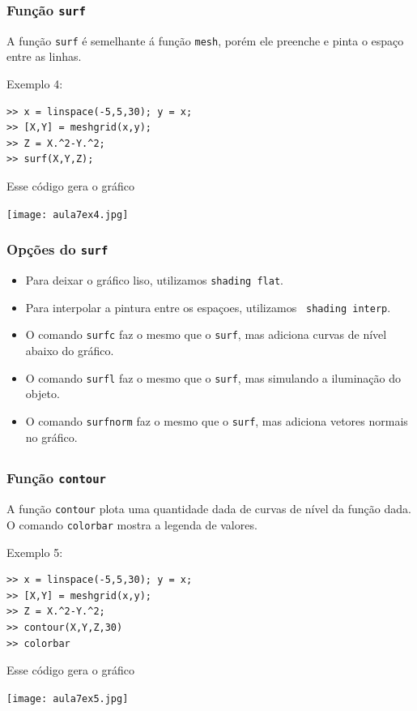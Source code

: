\documentclass{beamer}
\begin{document}
\begin{frame}[fragile]
\frametitle{Fun\c{c}\~ao {\tt surf}}
A fun\c{c}\~ao {\tt surf} \'e semelhante \'a fun\c{c}\~ao {\tt mesh}, por\'em
ele preenche e pinta o espa\c{c}o entre as linhas.

Exemplo 4:
{\scriptsize
\begin{verbatim}
>> x = linspace(-5,5,30); y = x;
>> [X,Y] = meshgrid(x,y);
>> Z = X.^2-Y.^2;
>> surf(X,Y,Z);
\end{verbatim}}
\pause
Esse c\'odigo gera o gr\'afico
\begin{center}
\texttt{[image: aula7ex4.jpg]}
\end{center}
\end{frame}

\begin{frame}[fragile]
\frametitle{Op\c{c}\~oes do {\tt surf}}

\begin{itemize}
\item<1-> Para deixar o gr\'afico liso, utilizamos {\tt shading flat}.
\item<2-> Para interpolar a pintura entre os espa\c{c}oes, utilizamos {\tt
shading interp}.
\item<3-> O comando {\tt surfc} faz o mesmo que o {\tt surf}, mas adiciona
curvas de n\'ivel abaixo do gr\'afico.
\item<4-> O comando {\tt surfl} faz o mesmo que o {\tt surf}, mas simulando a
ilumina\c{c}\~ao do objeto.
\item<5-> O comando {\tt surfnorm} faz o mesmo que o {\tt surf}, mas adiciona
vetores normais no gr\'afico.
\end{itemize}
\end{frame}

\subsection[Curvas de N\'ivel]{}

\begin{frame}[fragile]
\frametitle{Fun\c{c}\~ao {\tt contour}}
A fun\c{c}\~ao {\tt contour} plota uma quantidade dada de curvas de n\'ivel da
fun\c{c}\~ao dada. O comando {\tt colorbar} mostra a legenda de valores.

Exemplo 5:
{\scriptsize
\begin{verbatim}
>> x = linspace(-5,5,30); y = x;
>> [X,Y] = meshgrid(x,y);
>> Z = X.^2-Y.^2;
>> contour(X,Y,Z,30)
>> colorbar
\end{verbatim}}
\pause
Esse c\'odigo gera o gr\'afico
\begin{center}
\texttt{[image: aula7ex5.jpg]}
\end{center}
\end{frame}
\end{document}
